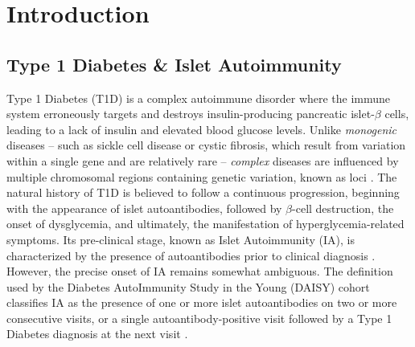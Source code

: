\documentclass{article}\usepackage[]{graphicx}\usepackage[]{color}
\begin{document}
\newpage
{}
\setcounter{page}{1}

\section{Introduction}
\label{sec:intro}

\subsection{Type 1 Diabetes \& Islet Autoimmunity}
\label{sec:ia}
Type 1 Diabetes (T1D) is a complex autoimmune disorder where the immune system erroneously targets and destroys insulin-producing pancreatic islet-$\beta$ cells, leading to a lack of insulin and elevated blood glucose levels\cite{katsarouType1Diabetes2017}. Unlike \textit{monogenic} diseases -- such as sickle cell disease or cystic fibrosis, which result from variation within a single gene and are relatively rare -- \textit{complex} diseases are influenced by multiple chromosomal regions containing genetic variation, known as loci \cite{MonogenicDisorderOverview}. The natural history of T1D is believed to follow a continuous progression, beginning with the appearance of islet autoantibodies, followed by $\beta$-cell destruction, the onset of dysglycemia, and ultimately, the manifestation of hyperglycemia-related symptoms. Its pre-clinical stage, known as Islet Autoimmunity (IA), is characterized by the presence of autoantibodies prior to clinical diagnosis \cite{katsarouType1Diabetes2017,onengut-gumuscuGeneticVariantsComplement2024}. However, the precise onset of IA remains somewhat ambiguous. The definition used by the Diabetes AutoImmunity Study in the Young (DAISY\cite{rewersNewbornScreeningHLA1996a}) cohort classifies IA as the presence of one or more islet autoantibodies on two or more consecutive visits, or a single autoantibody-positive visit followed by a Type 1 Diabetes diagnosis at the next visit \cite{frohnertLateonsetIsletAutoimmunity2017}.
\end{document}

